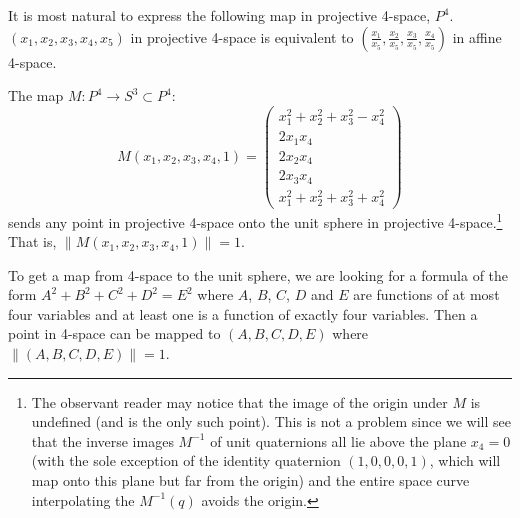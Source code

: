 \begin{notation}
It is most natural to express the following map in projective 4-space, $P^4$.
$(x_1,x_2,x_3,x_4,x_5)$ in projective 4-space is equivalent to
$(\frac{x_1}{x_5},\frac{x_2}{x_5},\frac{x_3}{x_5},\frac{x_4}{x_5})$ 
in affine 4-space.
\end{notation}

\begin{corollary}
The map $M:P^4 \rightarrow S^3 \subset P^4$:
\begin{equation}
\label{eq:M}
	M(x_1,x_2,x_3,x_4,1) = \left( \begin{array}{c}
		x_1^2+x_2^2+x_3^2-x_4^2 \\
		2x_1x_4 \\
		2x_2x_4 \\
		2x_3x_4 \\
		x_1^2+x_2^2+x_3^2+x_4^2
		\end{array} \right)
\end{equation}
sends any point in projective 4-space onto the unit sphere in projective
4-space.\footnote{The observant reader may notice that the image 
of the origin under $M$ is undefined (and is the only such point).
This is not a problem since we will see that the inverse images 
$M^{-1}$ of unit quaternions all lie above the plane $x_4=0$
(with the sole exception of the identity quaternion $(1,0,0,0,1)$,
which will map onto this plane but far from the origin)
and the entire space curve interpolating the $M^{-1}(q)$ avoids the origin.
}
That is, $\| M(x_1,x_2,x_3,x_4,1) \| = 1$.
\end{corollary}

\begin{rmk}
To get a map from 4-space to the unit sphere,
we are looking for a formula of the form $A^2+B^2+C^2+D^2=E^2$
where $A$, $B$, $C$, $D$ and $E$ are functions of at most four variables
and at least one is a function of exactly four variables.
Then a point in 4-space can be
mapped to $(A,B,C,D,E)$ where $\|(A,B,C,D,E)\| = 1$.
\end{rmk}



